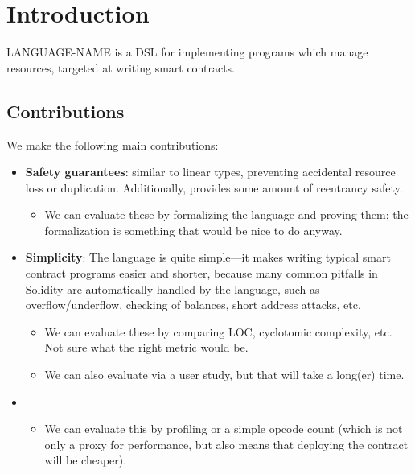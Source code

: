 \documentclass[10pt]{article}
\newcommand{\langName}{LANGUAGE-NAME\xspace}
\begin{document}
\section{Introduction}

\langName is a DSL for implementing programs which manage resources, targeted at writing smart contracts.

\subsection{Contributions}

We make the following main contributions:
\begin{itemize}
    \item \textbf{Safety guarantees}: similar to  linear types, preventing accidental resource loss or duplication.
        Additionally, provides some amount of reentrancy safety.

        \begin{itemize}
            \item We can evaluate these by formalizing the language and proving them; the formalization is something that would be nice to do anyway.
        \end{itemize}

    \item \textbf{Simplicity}: The language is quite simple---it makes writing typical smart contract programs easier and shorter, because many common pitfalls in Solidity are automatically handled by the language, such as overflow/underflow, checking of balances, short address attacks, etc.

        \begin{itemize}
            \item We can evaluate these by comparing LOC, cyclotomic complexity, etc.
                Not sure what the right metric would be.

            \item We can also evaluate via a user study, but that will take a long(er) time.
        \end{itemize}

    \item {}

        \begin{itemize}
            \item We can evaluate this by profiling or a simple opcode count (which is not only a proxy for performance, but also means that deploying the contract will be cheaper).
        \end{itemize}
\end{itemize}
\end{document}

